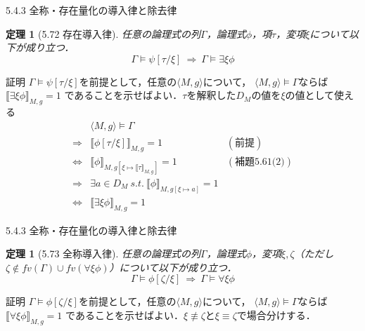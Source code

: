 \documentclass[dvipdfmx,11pt]{beamer}
\newtheorem{theo}[theorem]{定理}
\begin{document}
\begin{frame}{5.4.3 全称・存在量化の導入律と除去律}
  \begin{theo}[5.72 存在導入律]
    任意の論理式の列\(\Gamma\)，論理式\(\phi\)，項\(\tau\)，変項\(\xi\)について以下が成り立つ．
    \[
    \Gamma \vDash \psi [ \tau / \xi ] \ \Longrightarrow \ \Gamma \vDash \exists \xi \phi
    \]
  \end{theo}

  \begin{block}{証明}
    \(\Gamma \vDash \psi [ \tau / \xi ]\)を前提として，任意の\(\langle M,g \rangle\)について，
    \(\langle M,g \rangle \vDash \Gamma\)ならば\(\llbracket \exists \xi \phi \rrbracket_{M,g}=1\)
    であることを示せばよい．\(\tau\)を解釈した\(D_M\)の値を\(\xi\)の値として使える
    \[
    \begin{array}{rll}
      & \langle M,g \rangle \vDash \Gamma & \\
      \Longrightarrow & \llbracket \phi [ \tau / \xi ] \rrbracket_{M,g} = 1 & (\textit{前提}) \\
      \iff & \llbracket \phi \rrbracket_{M,g[\xi\mapsto\llbracket\tau\rrbracket_{M,g}]} = 1 & (\textit{補題5.61(2)}) \\
      \Longrightarrow & \exists a \in D_M \ s.t. \ \llbracket \phi \rrbracket_{M,g[\xi\mapsto a]} = 1 & \\
      \iff & \llbracket \exists \xi \phi \rrbracket_{M,g} = 1 &
    \end{array}
    \]
  \end{block}
\end{frame}

\begin{frame}{5.4.3 全称・存在量化の導入律と除去律}
  \begin{theo}[5.73 全称導入律]
    任意の論理式の列\(\Gamma\)，論理式\(\phi\)，変項\(\xi,\zeta\)（ただし\(\zeta \notin \textit{fv}(\Gamma) \cup \textit{fv}(\forall \xi \phi)\)）について以下が成り立つ．
    \[
    \Gamma \vDash \phi [ \zeta / \xi ] \ \Longrightarrow \ \Gamma \vDash \forall \xi \phi
    \]
  \end{theo}
  \begin{block}{証明}
    \(\Gamma \vDash \phi [ \zeta / \xi ]\)を前提として，任意の\(\langle M,g \rangle\)について，
    \(\langle M,g \rangle \vDash \Gamma\)ならば\(\llbracket \forall \xi \phi \rrbracket_{M,g}=1\)
    であることを示せばよい．\(\xi\not\equiv\zeta\)と\(\xi\equiv\zeta\)で場合分けする．
  \end{block}
\end{frame}
\end{document}
